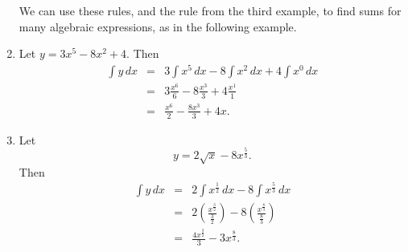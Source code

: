 \documentclass[twoside,openright]{article}
\newlength{\oldjot}
\begin{document}
\begin{enumerate}
We can use these rules, and the rule from the third example, to find sums for many algebraic expressions, as in the following example.

\item
Let $y = 3x^5 - 8x^2 + 4.$
Then
\setlength{\jot}{1.5ex}
\begin{eqnarray*}
\int\!y\,dx & = & 3\int\!x^5\,dx- 8\int\!x^2\,dx + 4\int\!x^0\,dx\\
& = & 3\frac{x^6}{6} - 8\frac{x^3}{3} + 4\frac{x^1}{1}\\
& = & \frac{x^6}{2} - \frac{8x^3}{3} + 4x.
\end{eqnarray*}
\setlength{\jot}{\oldjot}

\item
Let 
$$y = 2\sqrt{x} - 8x^{\frac{5}{3}}.$$
Then
\setlength{\jot}{2ex}
\begin{eqnarray*}
\int\!y\,dx & = & 2\int\!x^{\frac{1}{2}}\,dx - 8\int\!x^{\frac{5}{3}}\,dx\\
& = & 2\left(\frac{x^{\frac{3}{2}}}{\frac{3}{2}}\right) - 8\left(\frac{x^{\frac{8}{3}}}{\frac{8}{3}}\right)\\
& = & \frac{4x^{\frac{3}{2}}}{3} - 3x^{\frac{8}{3}}.
\end{eqnarray*}
\setlength{\jot}{\oldjot}
\end{enumerate}
\end{document}
